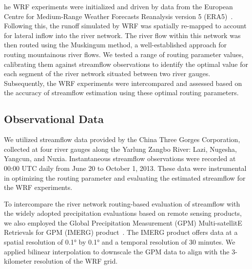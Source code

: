 \documentclass[draft]{agujournal2019}
\begin{document}
he WRF experiments were initialized and driven by data from the European Centre for Medium-Range Weather Forecasts Reanalysis version 5 (ERA5)~\cite{hersbach2020QJRMS}. Following this, the runoff simulated by WRF was spatially re-mapped to account for lateral inflow into the river network. The river flow within this network was then routed using the Muskingum method, a well-established approach for routing mountainous river flows. We tested a range of routing parameter values, calibrating them against streamflow observations to identify the optimal value for each segment of the river network situated between two river gauges. Subsequently, the WRF experiments were intercompared and assessed based on the accuracy of streamflow estimation using these optimal routing parameters.

\subsection{Observational Data}
\label{sec:data}

We utilized streamflow data provided by the China Three Gorges Corporation, collected at four river gauges along the Yarlung Zangbo River: Lazi, Nugesha, Yangcun, and Nuxia. Instantaneous streamflow observations were recorded at 00:00 UTC daily from June 20 to October 1, 2013. These data were instrumental in optimizing the routing parameter and evaluating the estimated streamflow for the WRF experiments.

To intercompare the river network routing-based evaluation of streamflow with the widely adopted precipitation evaluations based on remote sensing products, we also employed the Global Precipitation Measurement (GPM) Multi-satellitE Retrievals for GPM (IMERG) product~\cite{huffman2019GPM}. The IMERG product offers data at a spatial resolution of 0.1° by 0.1° and a temporal resolution of 30 minutes. We applied bilinear interpolation to downscale the GPM data to align with the 3-kilometer resolution of the WRF grid.
\end{document}
